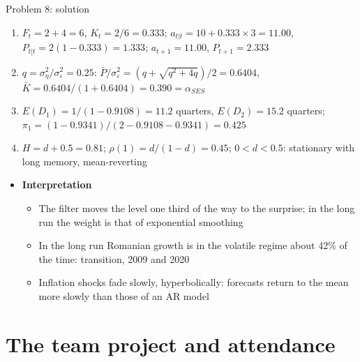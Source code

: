 \begin{frame}{Problem 8: solution}
\itemsize{\footnotesize}
\begin{enumerate}
    \item $F_t = 2 + 4 = 6$, $K_t = 2/6 = 0.333$; $a_{t|t} = 10 + 0.333 \times 3 = 11.00$, $P_{t|t} = 2(1 - 0.333) = 1.333$; $a_{t+1} = 11.00$, $P_{t+1} = 2.333$
    \item $q = \sigma^2_\eta/\sigma^2_\varepsilon = 0.25$: $\bar P/\sigma^2_\varepsilon = (q + \sqrt{q^2 + 4q})/2 = 0.6404$, $\bar K = 0.6404/(1 + 0.6404) = 0.390 = \alpha_{SES}$
    \item $E(D_1) = 1/(1 - 0.9108) = 11.2$ quarters, $E(D_2) = 15.2$ quarters; $\pi_1 = (1 - 0.9341)/(2 - 0.9108 - 0.9341) = 0.425$
    \item $H = d + 0.5 = 0.81$; $\rho(1) = d/(1 - d) = 0.45$; $0 < d < 0.5$: stationary with long memory, mean-reverting
\end{enumerate}
\begin{itemize}
    \item \textbf{Interpretation}
    \begin{itemize}
        \item The filter moves the level one third of the way to the surprise; in the long run the weight is that of exponential smoothing
        \item In the long run Romanian growth is in the volatile regime about 42\% of the time: transition, 2009 and 2020
        \item Inflation shocks fade slowly, hyperbolically: forecasts return to the mean more slowly than those of an AR model
    \end{itemize}
\end{itemize}
\end{frame}


\section{The team project and attendance}

